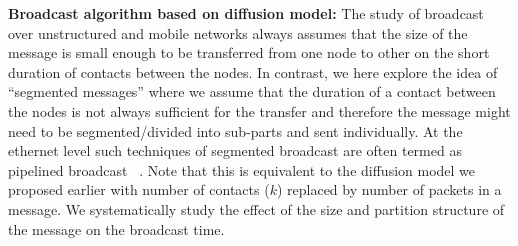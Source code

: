 \noindent
{\bf Broadcast algorithm based on diffusion model:} The study of broadcast over unstructured and mobile networks always assumes that the 
size of the message is  small enough to be transferred from one node to other 
on the short duration of contacts between the nodes. 
In contrast, we here explore
 the idea of ``segmented messages'' where we assume that the duration of a contact 
between the nodes is not always sufficient for the transfer and therefore the message might need to be 
segmented/divided into sub-parts and sent individually. 
At the ethernet level such techniques of segmented broadcast are often termed as pipelined broadcast 
~\cite{patarasuk2008techniques, watts1995pipelined}. Note that this is equivalent to the diffusion model we proposed earlier with number of contacts ($k$) replaced by number 
of packets in a message. 
We systematically study the effect of the size and partition structure of the message on the broadcast time.

